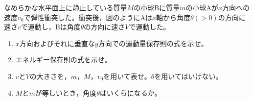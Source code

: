 \hakosyokika
\item
    \begin{mawarikomi}{120pt}{}
        なめらかな水平面上に静止している質量$M$の小球Bに質量$m$の小球Aが$x$方向への速度$v_0$で弾性衝突した。衝突後，図のようにAは$x$軸から角度$\theta (>0)$の方向に速さ$v$で運動し，Bは角度$\theta $の方向に速さ$V$で運動した。
        \begin{enumerate}
            \item $x$方向およびそれに垂直な$y$方向での運動量保存則の式を示せ。
            \item エネルギー保存則の式を示せ。
            \item $v$と$V$の大きさを，$m$，$M$，$v_0$を用いて表せ。$\theta $を用いてはいけない。
            \item $M$と$m$が等しいとき，角度$\theta $はいくらになるか。
        \end{enumerate}
    \end{mawarikomi}